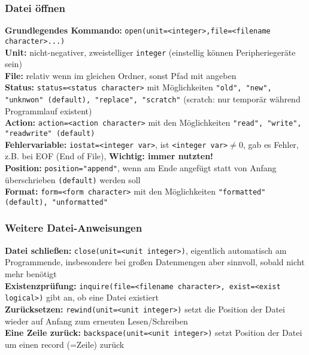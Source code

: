 \documentclass[a4paper, twocolumn]{scrarticle}
\begin{document}
 \subsubsection{Datei öffnen}
 \textbf{Grundlegendes Kommando:} \lstinline|open(unit=<integer>,file=<filename character>...)|\\
 \textbf{Unit:} nicht-negativer, zweistelliger \lstinline|integer| (einstellig können Peripheriegeräte sein)\\
 \textbf{File:} relativ wenn im gleichen Ordner, sonst Pfad mit angeben\\
 \textbf{Status:} \lstinline|status=<status character>| mit Möglichkeiten \lstinline|"old", "new", "unknwon" (default), "replace", "scratch"| (scratch: nur temporär während Programmlauf existent)\\
 \textbf{Action:} \lstinline|action=<action character>| mit den Möglichkeiten \lstinline|"read", "write", "readwrite" (default)|\\
 \textbf{Fehlervariable:} \lstinline|iostat=<integer var>|, ist \lstinline|<integer var>|$\neq 0$, gab es Fehler, z.B. bei EOF (End of File), \textbf{Wichtig: immer nutzten!}\\
 \textbf{Position:} \lstinline|position="append"|, wenn am Ende angefügt statt von Anfang überschrieben \lstinline|(default)| werden soll\\
 \textbf{Format:} \lstinline|form=<form character>| mit den Möglichkeiten \lstinline|"formatted" (default), "unformatted"|
 \subsubsection{Weitere Datei-Anweisungen}
 \textbf{Datei schließen:} \lstinline|close(unit=<unit integer>)|, eigentlich automatisch am Programmende, insbesondere bei großen Datenmengen aber sinnvoll, sobald nicht mehr benötigt\\
 \textbf{Existenzprüfung:} \lstinline|inquire(file=<filename character>, exist=<exist logical>)| gibt an, ob eine Datei existiert\\
 \textbf{Zurücksetzen:} \lstinline|rewind(unit=<unit integer>)| setzt die Position der Datei wieder auf Anfang zum erneuten Lesen/Schreiben\\
 \textbf{Eine Zeile zurück:} \lstinline|backspace(unit=<unit integer>)| setzt Position der Datei um einen record (=Zeile) zurück
 
\end{document}
